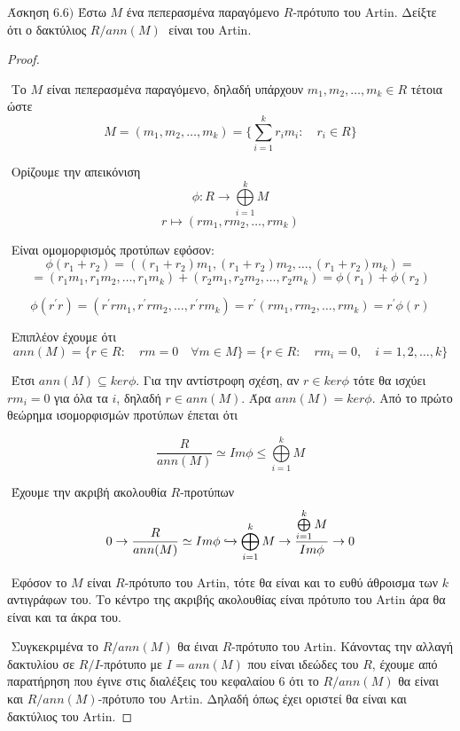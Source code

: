 \documentclass[oneside,a4paper]{article}
\newcommand {\tl}{\textlatin}
\begin{document}
\noindent Άσκηση $6.6)$
\quad Έστω $M$ ένα πεπερασμένα παραγόμενο $R$-πρότυπο του \tl{Artin}. Δείξτε ότι ο δακτύλιος ${R}/{ann(M)}\;$ είναι του \tl{Artin}.
\vspace*{1cm}
\begin{proof} $ $

	$ $\newline
	Το $M$ είναι πεπερασμένα παραγόμενο, δηλαδή υπάρχουν $m_1 , m_2 ,\ldots, m_k \in R$ τέτοια ώστε
	$$M = (m_1 , m_2 ,\ldots , m_k) = \big \{ \sum\limits_{i=1}^k r_i m_i : \quad r_i \in R \big \} $$

	$ $\newline
	Ορίζουμε την απεικόνιση
	$$\phi : R \longrightarrow \bigoplus\limits_{i=1}^k M$$
	$$r \longmapsto (rm_1, rm_2 , \ldots , rm_k)$$

	$ $\newline
	Είναι ομομορφισμός προτύπων εφόσον:
	$$\phi(r_1 + r_2) = ((r_1+r_2)m_1, (r_1+r_2)m_2 , \ldots , (r_1+r_2)m_k) = $$
	$$=  (r_1 m_1, r_1 m_2 , \ldots , r_1 m_k) + (r_2 m_1, r_2 m_2 , \ldots , r_2 m_k)  = \phi(r_1) + \phi (r_2)$$

	$$\phi(r^{\prime}r) = (r^{\prime}rm_1, r^{\prime}rm_2, \ldots , r^{\prime}rm_k) = r^{\prime}(rm_1, rm_2 , \ldots , rm_k) = r^{\prime}\phi(r)$$

	$ $\newline
	Επιπλέον έχουμε ότι $$ann(M) = \{r \in R: \quad rm = 0 \quad\forall m \in M\} = \{r \in R: \quad rm_i = 0, \quad i=1,2,\ldots,k\}$$

	$ $\newline
	Έτσι $ann(M) \subseteq ker\phi$. Για την αντίστροφη σχέση, αν $r \in ker\phi$ τότε θα ισχύει $rm_i = 0$ για όλα τα $i$, δηλαδή $r \in ann(M)$. Άρα $ ann(M) = ker\phi$. Από το πρώτο θεώρημα ισομορφισμών προτύπων έπεται ότι

	$$\frac{R}{ann(M)} \simeq Im\phi \leq \bigoplus\limits_{i=1}^k M$$

	$ $\newline
	Έχουμε την ακριβή ακολουθία $R$-προτύπων
	$$0\rightarrow \frac{R}{ann(M)} \simeq Im\phi \xhookrightarrow{} \bigoplus\limits_{i=1}^k M \rightarrow \frac{\bigoplus\limits_{i=1}^k M}{Im\phi} \rightarrow 0 $$

	$ $\newline
	Εφόσον το $M$ είναι $R$-πρότυπο του \tl{Artin}, τότε θα είναι και το ευθύ άθροισμα των $k$ αντιγράφων του. Το κέντρο της ακριβής ακολουθίας είναι πρότυπο του \tl{Artin} άρα θα είναι και τα άκρα του. 
	
	$ $\newline
	Συγκεκριμένα το $R/ann(M)$ θα έιναι $R$-πρότυπο του \tl{Artin}. Κάνοντας την αλλαγή δακτυλίου σε $R/I$-πρότυπο με $I=ann(M)$ που είναι ιδεώδες του $R$, έχουμε από παρατήρηση που έγινε στις διαλέξεις του κεφαλαίου 6 ότι το $R/ann(M)$ θα είναι και $R/ann(M)$-πρότυπο του \tl{Artin}. Δηλαδή όπως έχει οριστεί θα είναι και δακτύλιος του \tl{Artin}.
\end{proof}
\pagebreak
\end{document}
